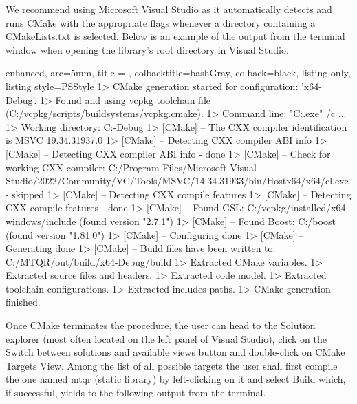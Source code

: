 \documentclass[a4paper, twosided]{book}
\begin{document}
We recommend using Microsoft Visual Studio as it automatically detects and runs CMake with the appropriate flags whenever a directory containing a \colorbox{poliGrayBlue}{CMakeLists.txt} is selected. Below is an example of the output from the terminal window when opening the library's root directory in Visual Studio.

\begin{tcblisting}{enhanced,
                   arc=5mm,
                   title = \color{black}{\large \ttfamily Build using Visual Studio},
                   colbacktitle=bashGray,
                   colback=black,
                   listing only,
                   listing style=PSStyle}
1> CMake generation started for configuration: 'x64-Debug'.
1> Found and using vcpkg toolchain file (C:/vcpkg/scripts/buildsystems/vcpkg.cmake).
1> Command line: "C:\WINDOWS{}\cmd.exe" /c  ...
1> Working directory: C:\MTQR\out\build{}-Debug
1> [CMake] -- The CXX compiler identification is MSVC 19.34.31937.0
1> [CMake] -- Detecting CXX compiler ABI info
1> [CMake] -- Detecting CXX compiler ABI info - done
1> [CMake] -- Check for working CXX compiler: C:/Program Files/Microsoft Visual Studio/2022/Community/VC/Tools/MSVC/14.34.31933/bin/Hostx64/x64/cl.exe - skipped
1> [CMake] -- Detecting CXX compile features
1> [CMake] -- Detecting CXX compile features - done
1> [CMake] -- Found GSL: C:/vcpkg/installed/x64-windows/include (found version "2.7.1") 
1> [CMake] -- Found Boost: C:/boost (found version "1.81.0")  
1> [CMake] -- Configuring done
1> [CMake] -- Generating done
1> [CMake] -- Build files have been written to: C:/MTQR/out/build/x64-Debug/build
1> Extracted CMake variables.
1> Extracted source files and headers.
1> Extracted code model.
1> Extracted toolchain configurations.
1> Extracted includes paths.
1> CMake generation finished.
\end{tcblisting}
\vspace{0.3cm}

\noindent
Once CMake terminates the procedure, the user can head to the \colorbox{poliGrayBlue}{Solution explorer} (most often located on the left panel of Visual Studio), click on the \colorbox{poliGrayBlue}{Switch between solutions and available views} button and double-click on \colorbox{poliGrayBlue}{CMake Targets View}. Among the list of all possible targets the user shall first compile the one named \colorbox{poliGrayBlue}{mtqr (static library)} by left-clicking on it and select \colorbox{poliGrayBlue}{Build} which, if successful, yields to the following output from the terminal.
\end{document}
